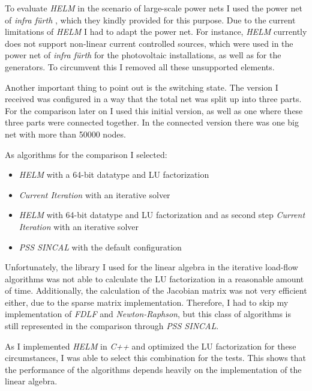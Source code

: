 To evaluate \emph{HELM} in the scenario of large-scale power nets I used the power net of \emph{infra fürth} , which they kindly provided for this purpose. Due to the current limitations of \emph{HELM} I had to adapt the power net. For instance, \emph{HELM} currently does not support non-linear current controlled sources, which were used in the power net of \emph{infra fürth} for the photovoltaic installations, as well as for the generators. To circumvent this I removed all these unsupported elements.

Another important thing to point out is the switching state. The version I received was configured in a way that the total net was split up into three parts. For the comparison later on I used this initial version, as well as one where these three parts were connected together. In the connected version there was one big net with more than 50000 nodes.

As algorithms for the comparison I selected:
\begin{itemize}
	\item \emph{HELM} with a 64-bit datatype and LU factorization
	\item \emph{Current Iteration} with an iterative solver
	\item \emph{HELM} with 64-bit datatype and LU factorization and as second step \emph{Current Iteration} with an iterative solver
	\item \emph{PSS SINCAL} with the default configuration
\end{itemize}
Unfortunately, the library I used for the linear algebra in the iterative load-flow algorithms was not able to calculate the LU factorization in a reasonable amount of time. Additionally, the calculation of the Jacobian matrix was not very efficient either, due to the sparse matrix implementation. Therefore, I had to skip my implementation of \emph{FDLF} and \emph{Newton-Raphson}, but this class of algorithms is still represented in the comparison through \emph{PSS SINCAL}.

As I implemented \emph{HELM} in \emph{C++} and optimized the LU factorization for these circumstances, I was able to select this combination for the tests. This shows that the performance of the algorithms depends heavily on the implementation of the linear algebra.

